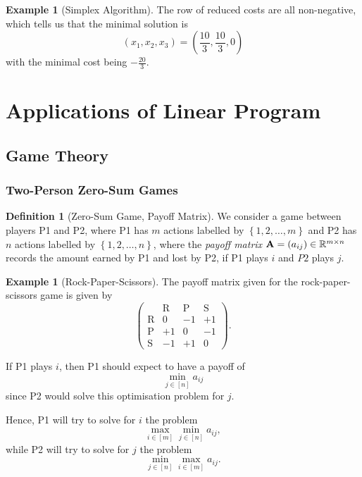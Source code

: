 \documentclass[11pt]{article}
\theoremstyle{definition}
\newtheorem{definition}[theorem]{Definition}
\newtheorem{example}[theorem]{Example}
\theoremstyle{remark}
\newcommand{\pqty}[1]{\left(#1\right)}
\newcommand{\bqty}[1]{\left[#1\right]}
\newcommand{\Bqty}[1]{\left\{#1\right\}}
\newcommand{\flatfrac}[2]{\frac{#1}{#2}}
\newcommand{\RR}{\mathbb{R}}
\begin{document}
\begin{example}[Simplex Algorithm]
    The row of reduced costs are all non-negative, which tells us that the minimal solution is
    \[
        \pqty{x_1, x_2, x_3} = \pqty{\frac{10}{3}, \frac{10}{3}, 0}
    \]
    with the minimal cost being \(-\flatfrac{20}{3}\).
\end{example}

\section{Applications of Linear Program}
\subsection{Game Theory}

\subsubsection{Two-Person Zero-Sum Games}

\begin{definition}[Zero-Sum Game, Payoff Matrix]\label{optim-unit-0055}
    We consider a game between players P1 and P2, where P1 has \(m\) actions labelled by \(\Bqty{1, 2, \ldots, m}\) and P2 has \(n\) actions labelled by \(\Bqty{1, 2, \ldots, n}\), where the \emph{payoff  matrix} \(\vb{A} = \pqty{a_{ij}} \in \RR^{m \times n}\) records the amount earned by P1 and lost by P2, if P1 plays \(i\) and \(P2\) plays \(j\).
\end{definition}

\begin{example}[Rock-Paper-Scissors]\label{optim-unit-0056}
    The payoff matrix given for the rock-paper-scissors game is given by
    \[
        \pqty{
            \begin{array}{c|ccc}
                & \text{R} & \text{P} & \text{S} \\
                \hline
                \text{R} & 0 & -1 & +1 \\
                \text{P} & +1 & 0 & -1 \\
                \text{S} & -1 & +1 & 0
            \end{array}
        }.
    \]
\end{example}

If P1 plays \(i\), then P1 should expect to have a payoff of
\[
    \min_{j \in \bqty{n}} a_{ij}
\]
since P2 would solve this optimisation problem for \(j\).

Hence, P1 will try to solve for \(i\) the problem
\[
    \max_{i \in \bqty{m}} \min_{j \in \bqty{n}} a_{ij},
\]
while P2 will try to solve for \(j\) the problem
\[
    \min_{j \in \bqty{n}} \max_{i \in \bqty{m}} a_{ij}.
\]
\end{document}

